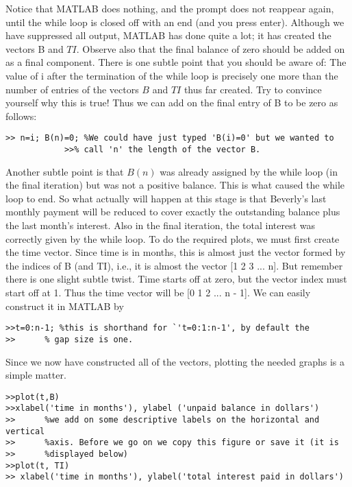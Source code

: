 \documentclass[../main.tex]{subfiles}
\begin{document}
Notice that MATLAB does nothing, and the prompt does not reappear again, until
the while loop is closed off with an end (and you press enter). Although we have
suppressed all output, MATLAB has done quite a lot; it has created the vectors B
and $TI$. Observe also that the final balance of zero should be added on as a final
component. There is one subtle point that you should be aware of: The value of
i after the termination of the while loop is precisely one more than the number of
entries of the vectors $B$ and $TI$ thus far created. Try to convince yourself why this
is true! Thus we can add on the final entry of B to be zero as follows: 

\begin{verbatim}
>> n=i; B(n)=0; %We could have just typed 'B(i)=0' but we wanted to 
			>>% call 'n' the length of the vector B.
\end{verbatim}

Another subtle point is that $B(n)$ was already assigned by the while loop (in the
final iteration) but was not a positive balance. This is what caused the while loop
to end. So what actually will happen at this stage is that Beverly's last monthly
payment will be reduced to cover exactly the outstanding balance plus the last
month's interest. Also in the final iteration, the total interest was correctly given
by the while loop. To do the required plots, we must first create the time vector.
Since time is in months, this is almost just the vector formed by the indices of B
(and TI), i.e., it is almost the vector [1 2 3 ... n]. But remember there is one
slight subtle twist. Time starts off at zero, but the vector index must start off at 1.
Thus the time vector will be [0 1 2 ... n - 1]. We can easily construct it in
MATLAB by 

\begin{verbatim}
>>t=0:n-1; %this is shorthand for `'t=0:1:n-1', by default the
>>		% gap size is one.
\end{verbatim}

Since we now have constructed all of the vectors, plotting the needed graphs is a
simple matter. 

\begin{verbatim}
>>plot(t,B)
>>xlabel('time in months'), ylabel ('unpaid balance in dollars')
>> 		%we add on some descriptive labels on the horizontal and vertical
>> 		%axis. Before we go on we copy this figure or save it (it is
>> 		%displayed below)
>>plot(t, TI) 
>> xlabel('time in months'), ylabel('total interest paid in dollars')
\end{verbatim}
\end{document}
